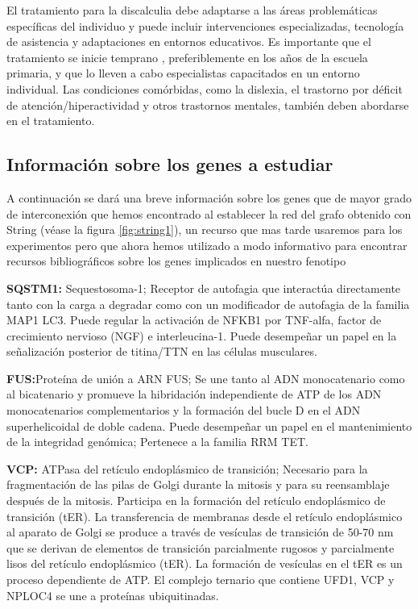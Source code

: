 \hfill

El tratamiento para la discalculia debe adaptarse a las áreas problemáticas específicas del individuo y puede incluir intervenciones  especializadas, tecnología de asistencia y adaptaciones en entornos educativos. Es importante que el tratamiento se inicie temprano \cite{ManagementDis}, preferiblemente en los años de la escuela primaria, y que lo lleven a cabo especialistas capacitados en un entorno individual. Las condiciones comórbidas, como la dislexia, el trastorno por déficit de atención/hiperactividad y otros trastornos mentales, también deben abordarse en el tratamiento.

\hfill



\hfill

\subsection{Información sobre los genes a estudiar}


A continuación se dará una breve información sobre los genes que de mayor grado de interconexión que hemos encontrado al establecer la red del grafo obtenido con String (véase la figura \ref{fig:string1}), un recurso que mas tarde usaremos para los experimentos pero que ahora hemos utilizado a modo informativo para encontrar recursos bibliográficos sobre los genes implicados en nuestro fenotipo

\hfill

\textbf{SQSTM1\cite{SQSTM1}:} Sequestosoma-1; Receptor de autofagia que interactúa directamente tanto con la carga a degradar como con un modificador de autofagia de la familia MAP1 LC3. Puede regular la activación de NFKB1 por TNF-alfa, factor de crecimiento nervioso (NGF) e interleucina-1. Puede desempeñar un papel en la señalización posterior de titina/TTN en las células musculares.

\hfill

\textbf{FUS\cite{FUS}:}Proteína de unión a ARN FUS; Se une tanto al ADN monocatenario como al bicatenario y promueve la hibridación independiente de ATP de los ADN monocatenarios complementarios y la formación del bucle D en el ADN superhelicoidal de doble cadena. Puede desempeñar un papel en el mantenimiento de la integridad genómica; Pertenece a la familia RRM TET.

\hfill

\textbf{VCP\cite{VCP}:} ATPasa del retículo endoplásmico de transición; Necesario para la fragmentación de las pilas de Golgi durante la mitosis y para su reensamblaje después de la mitosis. Participa en la formación del retículo endoplásmico de transición (tER). La transferencia de membranas desde el retículo endoplásmico al aparato de Golgi se produce a través de vesículas de transición de 50-70 nm que se derivan de elementos de transición parcialmente rugosos y parcialmente lisos del retículo endoplásmico (tER). La formación de vesículas en el tER es un proceso dependiente de ATP. El complejo ternario que contiene UFD1, VCP y NPLOC4 se une a proteínas ubiquitinadas.

